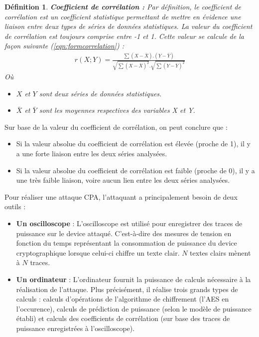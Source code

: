 \documentclass[oneside]{book}
\newtheorem{definition}{Définition}[section]
\begin{document}
\theoremstyle{definition}
\begin{definition}{\textbf{Coefficient de corrélation :}}
Par définition, le coefficient de corrélation est un coefficient statistique permettant de mettre en évidence une liaison entre deux types de séries de données statistiques. La valeur du coefficient de corrélation est toujours comprise entre -1 et 1. Cette valeur se calcule de la façon suivante (\ref{eqn:formcorrelation}) :
\begin{gather}
	r(X;Y) = \frac{\sum(X-\bar{X}).(Y-\bar{Y}) }{\sqrt{\sum(X-\bar{X})^2}.\sqrt{\sum(Y-\bar{Y})^2}}\label{eqn:formcorrelation}
\end{gather}
Où 
\begin{itemize}
\item $X$ et $Y$ sont deux séries de données statistiques.
\item $\bar{X}$ et $\bar{Y}$ sont les moyennes respectives des variables X et Y.\vspace{0.4 cm}
\end{itemize}
\end{definition}

\vspace{-0.4cm}\hspace{-0.5 cm}Sur base de la valeur du coefficient de corrélation, on peut conclure que :
\begin{itemize}
\item Si la valeur absolue du coefficient de corrélation est élevée (proche de 1), il y a une forte liaison entre les deux séries analysées.
\item Si la valeur absolue du coefficient de corrélation est faible (proche de 0), il y a une très faible liaison, voire aucun lien entre les deux séries analysées.
\end{itemize}

\hspace{-0.5 cm}Pour réaliser une attaque CPA, l'attaquant a principalement besoin de deux outils :
\begin{itemize}
\item \textbf{Un oscilloscope} : L'oscilloscope est utilisé pour enregistrer des traces de puissance sur le device attaqué. C'est-à-dire des mesures de tension en fonction du temps représentant la consommation de puissance du device cryptographique lorsque celui-ci chiffre un texte clair. $N$ textes clairs mènent à $N$ traces.
\item \textbf{Un ordinateur} : L'ordinateur fournit la puissance de calculs nécessaire à la réalisation de l'attaque. Plus précisément, il réalise trois grands types de calculs : calculs d'opérations de l'algorithme de chiffrement (l'AES en l'occurence), calculs de prédiction de puissance (selon le modèle de puissance établi) et calculs des coefficients de corrélation (sur base des traces de puissance enregistrées à l'oscilloscope). \\
\end{itemize}
\end{document}
